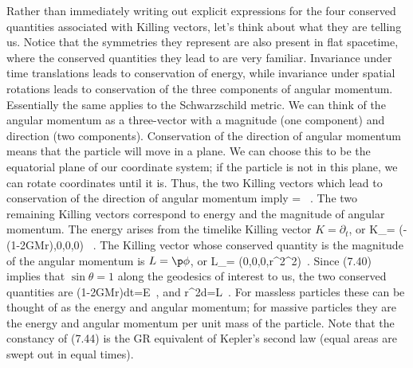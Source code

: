 \documentclass[12pt]{article}
\begin{document}
Rather than immediately writing out explicit expressions for the
four conserved quantities associated with Killing vectors, let's think
about what they are telling us.  Notice that the symmetries they
represent are also present in flat spacetime, where the conserved
quantities they lead to are very familiar.  Invariance under time
translations leads to conservation of energy, while invariance under
spatial rotations leads to conservation of the three components of
angular momentum.  Essentially the same applies to the Schwarzschild
metric.  We can think of the angular momentum as a three-vector with
a magnitude (one component) and direction (two components).  Conservation
of the direction of angular momentum means that the particle will move
in a plane.  We can choose this to be the equatorial plane of our 
coordinate system; if the particle is not in this plane, we can rotate
coordinates until it is.  Thus, the two Killing vectors which lead to
conservation of the direction of angular momentum imply
\be
  \theta = {\pi{}}\ .\label{7.40}
\ee
The two remaining Killing vectors correspond to energy and the
magnitude of angular momentum.  The energy arises from the timelike
Killing vector $K = \partial_t$, or
\be
  K_\mu = \left(-\left(1-{{2GM}\over r}\right),0,0,0\right)
  \ .\label{7.41}
\ee
The Killing vector whose conserved quantity is the magnitude of the
angular momentum is $L = \p\phi$, or
\be
  L_\mu = \left(0,0,0,r^2\sin^2\theta \right)\ .\label{7.42}
\ee
Since (7.40) implies that $\sin\theta = 1$ along the geodesics of
interest to us, the two conserved quantities are
\be
  \left(1-{{2GM}\over r}\right){{dt}}=E\ ,\label{7.43}
\ee
and
\be
  r^2{{d\phi}}=L\ .\label{7.44}
\ee
For massless particles these can be thought of as the energy and 
angular momentum; for massive particles they are the energy and
angular momentum per unit mass of the particle.  Note that the 
constancy of (7.44) is the GR equivalent of Kepler's second law
(equal areas are swept out in equal times).
\end{document}

